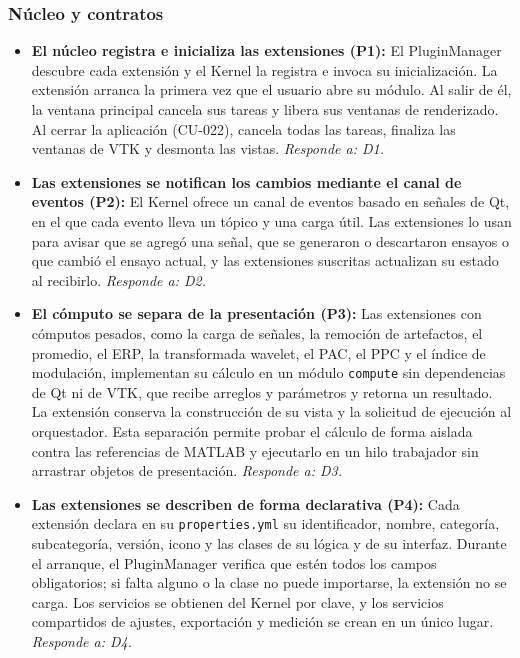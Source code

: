 \documentclass[11pt,a4paper]{article}
\DeclareRobustCommand{\_}{\textunderscore\allowbreak}
\begin{document}
\subsubsection{Núcleo y contratos}
\begin{itemize}
    \item \textbf{El núcleo registra e inicializa las extensiones (P1):} El PluginManager descubre cada extensión y el Kernel la registra e invoca su inicialización. La extensión arranca la primera vez que el usuario abre su módulo. Al salir de él, la ventana principal cancela sus tareas y libera sus ventanas de renderizado. Al cerrar la aplicación (CU-022), cancela todas las tareas, finaliza las ventanas de VTK y desmonta las vistas. \textit{Responde a: D1.}
    \item \textbf{Las extensiones se notifican los cambios mediante el canal de eventos (P2):} El Kernel ofrece un canal de eventos basado en señales de Qt, en el que cada evento lleva un tópico y una carga útil. Las extensiones lo usan para avisar que se agregó una señal, que se generaron o descartaron ensayos o que cambió el ensayo actual, y las extensiones suscritas actualizan su estado al recibirlo. \textit{Responde a: D2.}
    \item \textbf{El cómputo se separa de la presentación (P3):} Las extensiones con cómputos pesados, como la carga de señales, la remoción de artefactos, el promedio, el ERP, la transformada wavelet, el PAC, el PPC y el índice de modulación, implementan su cálculo en un módulo \texttt{compute} sin dependencias de Qt ni de VTK, que recibe arreglos y parámetros y retorna un resultado. La extensión conserva la construcción de su vista y la solicitud de ejecución al orquestador. Esta separación permite probar el cálculo de forma aislada contra las referencias de MATLAB y ejecutarlo en un hilo trabajador sin arrastrar objetos de presentación. \textit{Responde a: D3.}
    \item \textbf{Las extensiones se describen de forma declarativa (P4):} Cada extensión declara en su \texttt{properties.yml} su identificador, nombre, categoría, subcategoría, versión, icono y las clases de su lógica y de su interfaz. Durante el arranque, el PluginManager verifica que estén todos los campos obligatorios; si falta alguno o la clase no puede importarse, la extensión no se carga. Los servicios se obtienen del Kernel por clave, y los servicios compartidos de ajustes, exportación y medición se crean en un único lugar. \textit{Responde a: D4.}
\end{itemize}
\end{document}
